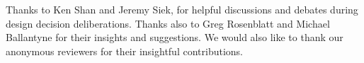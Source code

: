 \documentclass[sigplan,draft,balance,pbalance,natbib=false]{acmart}
\begin{document}
\begin{acks}

  Thanks to Ken Shan and Jeremy Siek, for helpful discussions and
  debates during design decision deliberations. Thanks also to Greg
  Rosenblatt and Michael Ballantyne for their insights and
  suggestions. We would also like to thank our anonymous reviewers
  for their insightful contributions.

\end{acks}

\printbibliography{}
\end{document}
